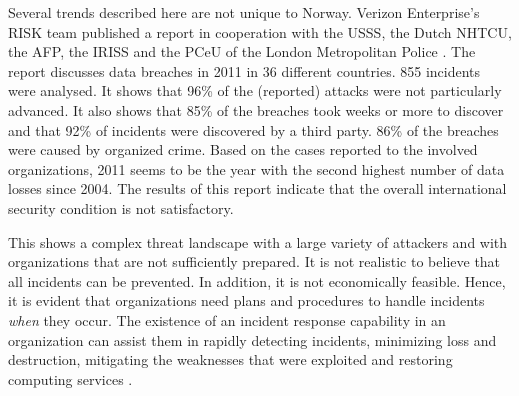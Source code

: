 Several trends described here are not unique to Norway. Verizon Enterprise's RISK team published a report in cooperation with the \ac{USSS}, the Dutch \ac{NHTCU}, the \ac{AFP}, the \ac{IRISS} and the \ac{PCeU} of the London Metropolitan Police \cite{VerizonReport}. The report discusses data breaches in 2011 in 36 different countries. 855 incidents were analysed. It shows that 96\% of the (reported) attacks were not particularly advanced. It also shows that 85\% of the breaches took weeks or more to discover and that 92\% of incidents were discovered by a third party. 86\% of the breaches were caused by organized crime. Based on the cases reported to the involved organizations, 2011 seems to be the year with the second highest number of data losses since 2004. The results of this report indicate that the overall international security condition is not satisfactory.

This shows a complex threat landscape with a large variety of attackers and with organizations that are not sufficiently prepared. It is not realistic to believe that all incidents can be prevented. In addition, it is not economically feasible. Hence, it is evident that organizations need plans and procedures to handle incidents \textit{when} they occur. The existence of an incident response capability in an organization can assist them in rapidly detecting incidents, minimizing loss and destruction, mitigating the weaknesses that were exploited and restoring computing services \cite{nist800-61}. 